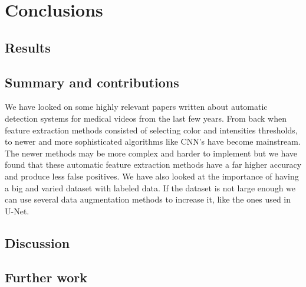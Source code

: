 \documentclass[thesis.tex]{subfiles}
\begin{document}
\chapter{Conclusions} \label{conclusions}


\section{Results} \label{results}


\section{Summary and contributions} \label{summaryandcontributions}
We have looked on some highly relevant papers written about automatic detection systems for medical videos from the last few years. From back when feature extraction methods consisted of selecting color and intensities thresholds, to newer and more sophisticated algorithms like CNN's have become mainstream. The newer methods may be more complex and harder to implement but we have found that these automatic feature extraction methods have a far higher accuracy and produce less false positives. We have also looked at the importance of having a big and varied dataset with labeled data. If the dataset is not large enough we can use several data augmentation methods to increase it, like the ones used in U-Net. 


\section{Discussion} \label{discussion}



\section{Further work} \label{further_work}
\end{document}
